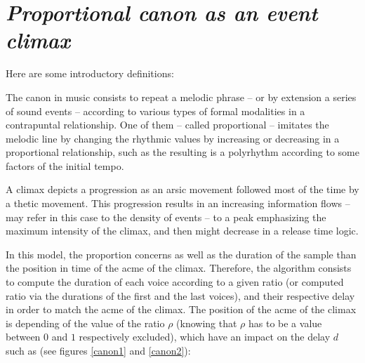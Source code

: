 
\section{\textsl{Proportional canon as an event climax}}

\label{imp2}

Here are some introductory definitions:

\smallskip

{The canon in music consists to repeat a melodic phrase -- or by extension a series of sound events -- according to various types of formal modalities in a contrapuntal relationship. One of them -- called proportional -- imitates the melodic line by changing the rhythmic values by increasing or decreasing in a proportional relationship, such as the resulting is a polyrhythm according to some factors of the initial tempo.}

{A climax depicts a progression as an arsic movement followed most of the time by a thetic movement. This progression results in an increasing information flows -- may refer in this case to the density of events -- to a peak emphasizing the maximum intensity of the climax, and then might decrease in a release time logic.}
  
  \bigskip
  
  In this model, the proportion concerns as well as the duration of the sample than the position in time of the acme of the climax.  Therefore, the algorithm consists to compute the duration of each voice according to a given ratio (or computed ratio via the durations of the first and the last voices), and their respective delay in order to match the acme of the climax.
  The position of the acme of the climax is depending of the value of the ratio $\rho$ (knowing that $\rho$ has to be a value between $0$ and $1$ respectively excluded), which have an impact on the delay $d$ such as (see figures \ref{canon1} and \ref{canon2}):
  
